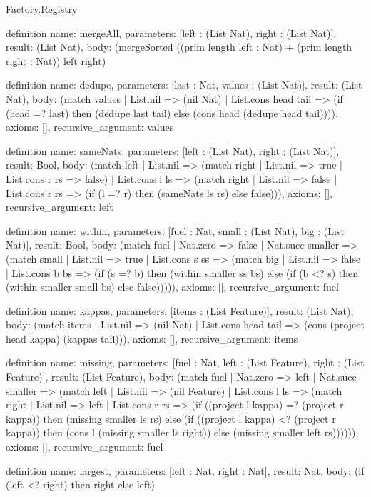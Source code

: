 \begin{lexlean}{Factory.Registry}
\begin{semanticmodule}
definition{
  name: mergeAll,
  parameters: [left : (List Nat), right : (List Nat)],
  result: (List Nat),
  body: (mergeSorted ((prim length left : Nat) + (prim length right : Nat)) left right)
}

definition{
  name: dedupe,
  parameters: [last : Nat, values : (List Nat)],
  result: (List Nat),
  body: (match values
    | List.nil => (nil Nat)
    | List.cons head tail => (if (head =? last) then (dedupe last tail) else (cons head (dedupe head tail)))),
  axioms: [],
  recursive_argument: values
}

definition{
  name: sameNats,
  parameters: [left : (List Nat), right : (List Nat)],
  result: Bool,
  body: (match left
    | List.nil => (match right
      | List.nil => true
      | List.cons r rs => false)
    | List.cons l ls => (match right
      | List.nil => false
      | List.cons r rs => (if (l =? r) then (sameNats ls rs) else false))),
  axioms: [],
  recursive_argument: left
}

definition{
  name: within,
  parameters: [fuel : Nat, small : (List Nat), big : (List Nat)],
  result: Bool,
  body: (match fuel
    | Nat.zero => false
    | Nat.succ smaller => (match small
      | List.nil => true
      | List.cons s ss => (match big
        | List.nil => false
        | List.cons b bs => (if (s =? b) then (within smaller ss bs) else (if (b <? s) then (within smaller small bs) else false))))),
  axioms: [],
  recursive_argument: fuel
}

definition{
  name: kappas,
  parameters: [items : (List Feature)],
  result: (List Nat),
  body: (match items
    | List.nil => (nil Nat)
    | List.cons head tail => (cons (project head kappa) (kappas tail))),
  axioms: [],
  recursive_argument: items
}

definition{
  name: missing,
  parameters: [fuel : Nat, left : (List Feature), right : (List Feature)],
  result: (List Feature),
  body: (match fuel
    | Nat.zero => left
    | Nat.succ smaller => (match left
      | List.nil => (nil Feature)
      | List.cons l ls => (match right
        | List.nil => left
        | List.cons r rs => (if ((project l kappa) =? (project r kappa)) then (missing smaller ls rs) else (if ((project l kappa) <? (project r kappa)) then (cons l (missing smaller ls right)) else (missing smaller left rs)))))),
  axioms: [],
  recursive_argument: fuel
}

definition{
  name: largest,
  parameters: [left : Nat, right : Nat],
  result: Nat,
  body: (if (left <? right) then right else left)
}


\end{semanticmodule}
\end{lexlean}

